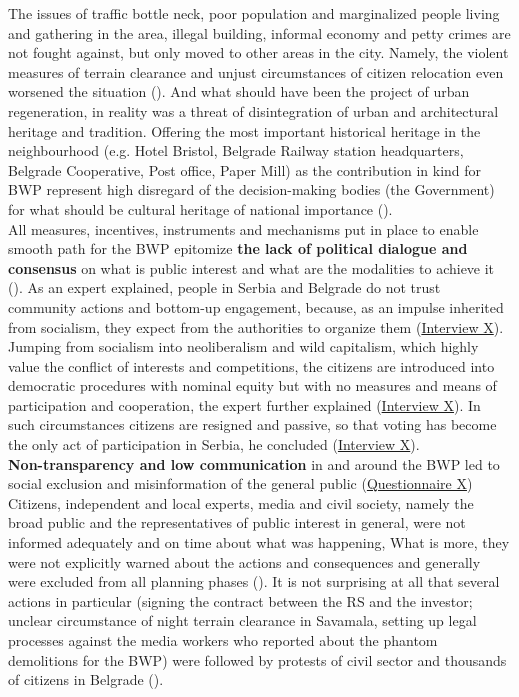 \documentclass[11pt]{report}
\begin{document}
The issues of traffic bottle neck, poor population and marginalized people living and gathering in the area, illegal building, informal economy and petty crimes are not fought against, but only moved to other areas in the city.
Namely, the violent measures of terrain clearance and unjust circumstances of citizen relocation even worsened the situation (\cite{media}).
And what should have been the project of urban regeneration, in reality was a threat of disintegration of urban and architectural heritage and tradition.
Offering the most important historical heritage in the neighbourhood (e.g. Hotel Bristol, Belgrade Railway station headquarters, Belgrade Cooperative, Post office, Paper Mill) as the contribution in kind for BWP represent high disregard of the decision-making bodies (the Government) for what should be cultural heritage of national importance (\cite{JVA2015}).
\\

All measures, incentives, instruments and mechanisms put in place to enable smooth path for the BWP epitomize \textbf{the lack of political dialogue and consensus} on what is public interest and what are the modalities to achieve it
(\href{Vujosevic}{\cite{vujosevic_post-socialist_2010}}).
As an expert explained, people in Serbia and Belgrade do not trust community actions and bottom-up engagement, because, as an impulse inherited from socialism, they expect from the authorities to organize them
(\href{InterviewX}{Interview X}).
Jumping from socialism into neoliberalism and wild capitalism, which highly value the conflict of interests and competitions, the citizens are introduced into democratic procedures with nominal equity but with no measures and means of participation and cooperation, the expert further explained (\href{InterviewX}{Interview X}).
In such circumstances citizens are resigned and passive, so that voting has become the only act of participation in Serbia, he concluded (\href{InterviewX}{Interview X}).
\\

\textbf{Non-transparency and low communication} in and around the BWP led to social exclusion and misinformation of the general public
(\href{Questionnaire Experts Savamala}{Questionnaire X})
Citizens, independent and local experts, media and civil society, namely the broad public and the representatives of public interest in general, were not informed adequately and on time about what was happening,
What is more, they were not explicitly warned about the actions and consequences and generally were excluded from all planning phases
(\citealt{ministarstvo_prostora_urbani_2014}). %
It is not surprising at all that several actions in particular (signing the contract between the RS and the investor; unclear circumstance of night terrain clearance in Savamala, setting up legal processes against the media workers who reported about the phantom demolitions for the BWP) were followed by protests of civil sector and thousands of citizens in Belgrade (\cite{media, fb}).
\\
\end{document}
